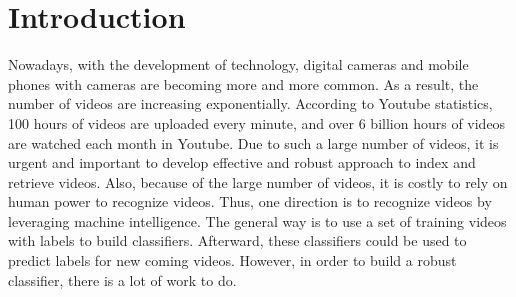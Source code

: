 \section {Introduction}
Nowadays, with the development of technology, digital cameras and mobile phones with cameras are becoming more and more common. As a result, the number of videos are increasing exponentially. According to Youtube statistics, 100 hours of videos are uploaded every minute, and over 6 billion hours of videos are watched each month in Youtube. Due to such a large number of videos, it is urgent and important to develop effective and robust approach to index and retrieve videos. Also, because of the large number of videos, it is costly to rely on human power to recognize videos. Thus, one direction is to recognize videos by leveraging machine intelligence. The general way is to use a set of training videos with labels to build classifiers. Afterward, these classifiers could be used to predict labels for new coming videos. However, in order to build a robust classifier, there is a lot of work to do. \\

